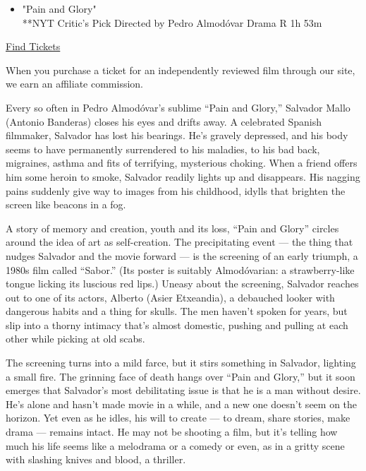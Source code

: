 \begin{itemize}
\tightlist
\item
  "Pain and Glory"\\
  **NYT Critic's Pick Directed by Pedro Almodóvar Drama R 1h 53m
\end{itemize}

\href{https://www.imdb.com/showtimes/title/tt8291806?ref_=ref_ext_NYT}{Find
Tickets}

When you purchase a ticket for an independently reviewed film through
our site, we earn an affiliate commission.

Every so often in Pedro Almodóvar's sublime ``Pain and Glory,'' Salvador
Mallo (Antonio Banderas) closes his eyes and drifts away. A celebrated
Spanish filmmaker, Salvador has lost his bearings. He's gravely
depressed, and his body seems to have permanently surrendered to his
maladies, to his bad back, migraines, asthma and fits of terrifying,
mysterious choking. When a friend offers him some heroin to smoke,
Salvador readily lights up and disappears. His nagging pains suddenly
give way to images from his childhood, idylls that brighten the screen
like beacons in a fog.

A story of memory and creation, youth and its loss, ``Pain and Glory''
circles around the idea of art as self-creation. The precipitating event
--- the thing that nudges Salvador and the movie forward --- is the
screening of an early triumph, a 1980s film called ``Sabor.'' (Its
poster is suitably Almodóvarian: a strawberry-like tongue licking its
luscious red lips.) Uneasy about the screening, Salvador reaches out to
one of its actors, Alberto (Asier Etxeandia), a debauched looker with
dangerous habits and a thing for skulls. The men haven't spoken for
years, but slip into a thorny intimacy that's almost domestic, pushing
and pulling at each other while picking at old scabs.

The screening turns into a mild farce, but it stirs something in
Salvador, lighting a small fire. The grinning face of death hangs over
``Pain and Glory,'' but it soon emerges that Salvador's most
debilitating issue is that he is a man without desire. He's alone and
hasn't made movie in a while, and a new one doesn't seem on the horizon.
Yet even as he idles, his will to create --- to dream, share stories,
make drama --- remains intact. He may not be shooting a film, but it's
telling how much his life seems like a melodrama or a comedy or even, as
in a gritty scene with slashing knives and blood, a thriller.

